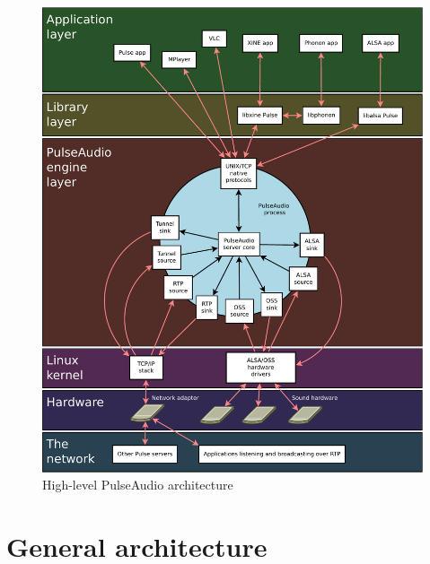 \documentclass[conference]{IEEEtran}
\begin{document}
\begin{figure}
\centering
\includegraphics[width=\columnwidth]{PulseAudio}
\caption{High-level PulseAudio architecture}
\end{figure}

\section{General architecture}
\end{document}
